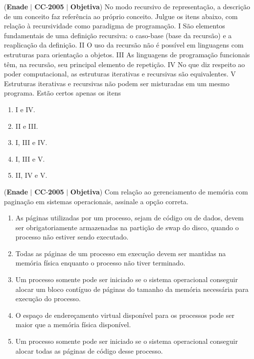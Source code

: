 \documentclass{exam}
\begin{document}
\begin{questions}
\question (\textbf{Enade} $|$ \textbf{CC}-\textbf{2005} $|$ \textbf{Objetiva})
No modo recursivo de representação, a descrição de um
conceito faz referência ao próprio conceito. Julgue os itens
abaixo, com relação à recursividade como paradigma de
programação.
I São elementos fundamentais de uma definição recursiva:
o caso-base (base da recursão) e a reaplicação da definição.
II O uso da recursão não é possível em linguagens com
estruturas para orientação a objetos.
III As linguagens de programação funcionais têm, na recursão,
seu principal elemento de repetição.
IV No que diz respeito ao poder computacional, as estruturas
iterativas e recursivas são equivalentes.
V Estruturas iterativas e recursivas não podem ser misturadas
em um mesmo programa.
Estão certos apenas os itens
	\begin{enumerate}[label=\alph*)]
		\item  I e IV.
		\item  II e III.
		\item  I, III e IV.
		\item  I, III e V.
		\item  II, IV e V.
	\end{enumerate}

\question (\textbf{Enade} $|$ \textbf{CC}-\textbf{2005} $|$ \textbf{Objetiva})
Com relação ao gerenciamento de memória com paginação em
sistemas operacionais, assinale a opção correta.
	\begin{enumerate}[label=\alph*)]
		\item  As páginas utilizadas por um processo, sejam de código ou de
dados, devem ser obrigatoriamente armazenadas na partição de
swap do disco, quando o processo não estiver sendo executado.
		\item  Todas as páginas de um processo em execução devem ser
mantidas na memória física enquanto o processo não tiver
terminado.
		\item  Um processo somente pode ser iniciado se o sistema
operacional conseguir alocar um bloco contíguo de páginas do
tamanho da memória necessária para execução do processo.
		\item  O espaço de endereçamento virtual disponível para os processos
pode ser maior que a memória física disponível.
		\item  Um processo somente pode ser iniciado se o sistema
operacional conseguir alocar todas as páginas de código
desse processo.
	\end{enumerate}


\end{questions}
\end{document}
